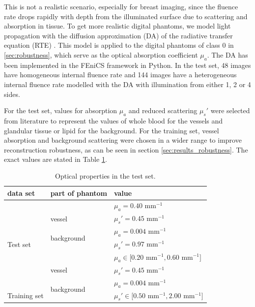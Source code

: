\documentclass[journal]{IEEEtran}
\begin{document}
This is not a realistic scenario, especially for breast imaging, since the fluence rate drops rapidly with depth from the illuminated surface due to scattering and absorption in tissue. To get more realistic digital phantoms, we model light propagation with the diffusion approximation (DA) of the radiative transfer equation (RTE) \cite{Schweiger1993}. This model is applied to the digital phantoms of class 0 in \ref{sec:robustness}, which serve as the optical absorption coefficient $\mu_a$. The DA has been implemented in the FEniCS framework \cite{Alnaes2014} in Python. In the test set, 48 images have homogeneous internal fluence rate and 144 images have a heterogeneous internal fluence rate modelled with the DA with illumination from either 1, 2 or 4 sides. 

For the test set, values for absorption $\mu_a$ and reduced scattering $\mu_s'$ were selected from literature \cite{Jacques2013} to represent the values of whole blood for the vessels and glandular tissue or lipid for the background. For the training set, vessel absorption and background scattering were chosen in a wider range to improve reconstruction robustness, as can be seen in section \ref{sec:results_robustness}. The exact values are stated in Table \ref{tab:opt_prop}.

\begin{table}[ht!]
\vspace{2mm}
\caption {Optical properties in the test set.}
\vspace{-3mm}
\begin{center}
\bgroup
\def\arraystretch{1.15}
\begin{tabular}{ l | l | l } 
 \hline
\textbf{data set} & \textbf{part of phantom} & \textbf{value}\\
\hline \hline
\cellcolor{gray!10}& \cellcolor{gray!25} & \cellcolor{gray!25}$\mu_a=0.40$ mm$^{-1}$\\ 
\cellcolor{gray!10}& \multirow{-2}{*}{\cellcolor{gray!25} vessel} & \cellcolor{gray!25}$\mu_s'=0.45$ mm$^{-1}$\\ \cline{2-3}
\cellcolor{gray!10}& \multirow{2}{*}{background} & $\mu_a=0.004$ mm$^{-1}$\\ 
\multirow{-4}{*}{\cellcolor{gray!10} Test set}& & $\mu_s'=0.97$ mm$^{-1}$\\
 \hline \hline
\cellcolor{gray!10} & \cellcolor{gray!25} & \cellcolor{gray!25}$\mu_a\in\big[0.20$ mm$^{-1}, 0.60$ mm$^{-1}\big]$\\ 
\cellcolor{gray!10} & \multirow{-2}{*}{\cellcolor{gray!25} vessel} & \cellcolor{gray!25}$\mu_s'=0.45$ mm$^{-1}$\\ \cline{2-3}
\cellcolor{gray!10}& \multirow{2}{*}{background} & $\mu_a=0.004$ mm$^{-1}$\\ 
\multirow{-4}{*}{\cellcolor{gray!10} Training set} & & $\mu_s'\in\big[0.50$ mm$^{-1}, 2.00$ mm$^{-1}\big]$\\
 \hline
\end{tabular}
\egroup
\end{center}\label{tab:opt_prop}
\vspace{-4mm}
\end{table} 
\end{document}
